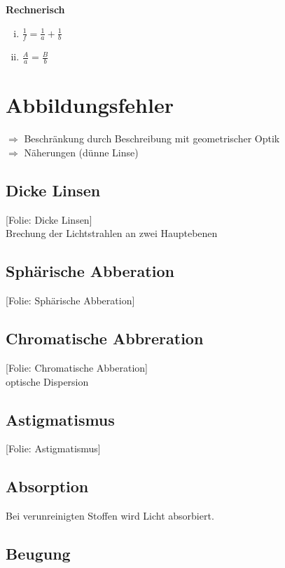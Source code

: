 \documentclass[titlepage,11pt,a4paper,ngerman]{report}
\newcommand{\folie}[1]{\color{gray}[Folie: #1]\color{black}}
\begin{document}

\textbf{Rechnerisch}
\begin{enumerate}[(i)]
	\item $ \frac{1}{f} = \frac{1}{a} + \frac{1}{b} $
	\item $ \frac{A}{a} = \frac{B}{b} $
\end{enumerate}

\section{Abbildungsfehler}

$ \Rightarrow $ Beschränkung durch Beschreibung mit geometrischer Optik\\
$ \Rightarrow $ Näherungen (dünne Linse)

\subsection{Dicke Linsen}

\folie{Dicke Linsen}\\
Brechung der Lichtstrahlen an zwei Hauptebenen

\subsection{Sphärische Abberation}

\folie{Sphärische Abberation}

\subsection{Chromatische Abbreration}

\folie{Chromatische Abberation}\\
optische Dispersion

\subsection{Astigmatismus}

\folie{Astigmatismus}

\subsection{Absorption}

Bei verunreinigten Stoffen wird Licht absorbiert.

\subsection{Beugung}
\end{document}

